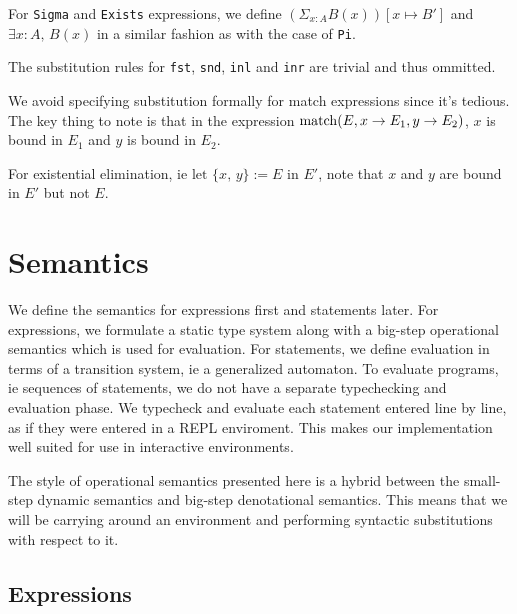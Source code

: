 \documentclass{article}
\begin{document}
For \verb|Sigma| and \verb|Exists| expressions, we define 
$(\Sigma_{x : A} B(x)) [x \mapsto B']$ and $\exists x : A, \, B(x)$ in a 
similar fashion as with the case of \verb|Pi|.

The substitution rules for \verb|fst|, \verb|snd|, \verb|inl| and \verb|inr| are
trivial and thus ommitted.

We avoid specifying substitution formally for match expressions since it's
tedious. The key thing to note is that in the expression
$\operatorname{match}(E, x \rightarrow E_1, y \rightarrow E_2)$, $x$ is bound in $E_1$ and $y$
is bound in $E_2$.

For existential elimination, ie $\text{let } \{x, \, y\} := E \text{ in } E'$,
note that $x$ and $y$ are bound in $E'$ but not $E$.

\section{Semantics}
We define the semantics for expressions first and statements later.
For expressions, we formulate a static type system along with a big-step
operational semantics which is used for evaluation.
For statements, we define evaluation in terms of a transition system, ie a
generalized automaton.
To evaluate programs, ie sequences of statements, we do not have a separate
typechecking and evaluation phase. We typecheck and evaluate each statement
entered line by line, as if they were entered in a REPL enviroment.
This makes our implementation well suited for use in interactive environments.

The style of operational semantics presented here is a hybrid between the
small-step dynamic semantics and big-step denotational semantics.
This means that we will be carrying around an environment and performing
syntactic substitutions with respect to it.

\begin{comment}
  https://www.andres-loeh.de/LambdaPi/LambdaPi.pdf
  http://math.andrej.com/2012/11/08/how-to-implement-dependent-type-theory-i/
  
  http://fsl.cs.illinois.edu/images/archive/b/b3/20110221180817!CS522-Spring-2011-PL-book-bigstep.pdf
  https://www.cs.cornell.edu/courses/cs4110/2010fa/lectures/lecture03.pdf
\end{comment}

\subsection{Expressions}
\end{document}
